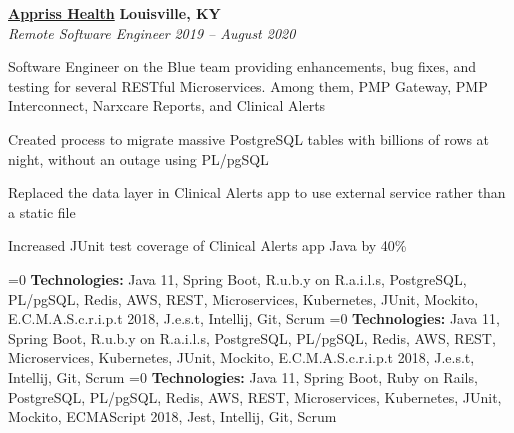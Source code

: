 %
    \headerrow
        {\textbf{\href{https://apprisshealth.com/}{Appriss Health}}}
        {\textbf{Louisville, KY}}
    \\
    \headerrow
        {\emph{Remote Software Engineer}}
        {\emph{2019 -- August 2020}}
    \begin{itemize*}
        \item Software Engineer on the Blue team providing enhancements, bug fixes, and testing for several RESTful Microservices.
            Among them, PMP Gateway, PMP Interconnect, Narxcare Reports, and Clinical Alerts
        \item Created process to migrate massive PostgreSQL tables with billions of rows at night, without an outage using PL/pgSQL
        \item Replaced the data layer in Clinical Alerts app to use external service rather than a static file
        \item Increased JUnit test coverage of Clinical Alerts app Java by 40\%
    \end{itemize*}

    \ifnum{}=0
    \hspace{1.0em}
        {\textbf{Technologies:} Java 11, Spring Boot, R.u.b.y on R.a.i.l.s, PostgreSQL, PL/pgSQL, Redis, AWS,
        REST, Microservices, Kubernetes, JUnit, Mockito, E.C.M.A.S.c.r.i.p.t 2018, J.e.s.t, Intellij, Git, Scrum}
    \fi
    \ifnum{}=0
    \hspace{1.0em}
        {\textbf{Technologies:} Java 11, Spring Boot, R.u.b.y on R.a.i.l.s, PostgreSQL, PL/pgSQL, Redis, AWS,
        REST, Microservices, Kubernetes, JUnit, Mockito, E.C.M.A.S.c.r.i.p.t 2018, J.e.s.t, Intellij, Git, Scrum}
    \fi
    \ifnum{}=0
    \hspace{1.0em}
        {\textbf{Technologies:} Java 11, Spring Boot, Ruby on Rails, PostgreSQL, PL/pgSQL, Redis, AWS,
        REST, Microservices, Kubernetes, JUnit, Mockito, ECMAScript 2018, Jest, Intellij, Git, Scrum}
    \fi



